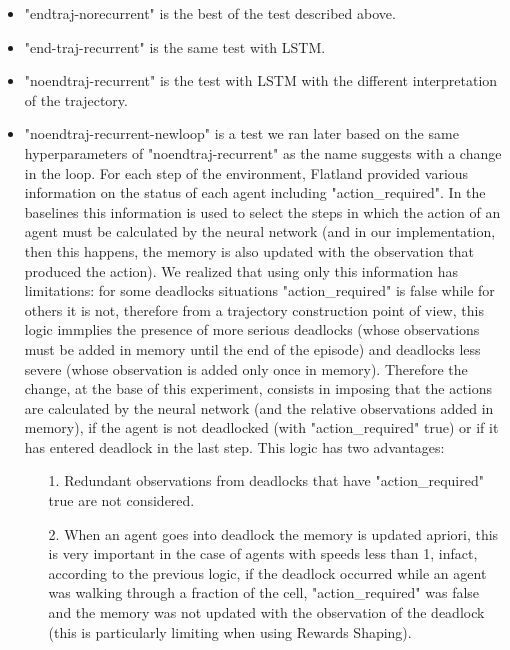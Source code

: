 \documentclass[11pt, a4paper, hidelinks]{report}
\begin{document}
\begin{itemize}
\item "endtraj-norecurrent" is the best of the test described above.
\item "end-traj-recurrent" is the same test with LSTM.
\item "noendtraj-recurrent" is the test with LSTM with the different interpretation of the trajectory. 
\item "noendtraj-recurrent-newloop" is a test we ran later based on the same hyperparameters of "noendtraj-recurrent" as the name suggests with a change in the loop. For each step of the environment, Flatland provided various information on the status of each agent including "action\_required". 
In the baselines this information is used to select the steps in which the action of an agent must be calculated by the neural network (and in our implementation, then this happens, the memory is also updated with the observation that produced the action). 
We realized that using only this information has limitations: for some deadlocks situations "action\_required" is false while for others it is not, therefore from a trajectory construction point of view, this logic immplies the presence of more serious deadlocks (whose observations must be added in memory until the end of the episode) and deadlocks less severe (whose observation is added only once in memory). 
Therefore the change, at the base of this experiment, consists in imposing that the actions are calculated by the neural network (and the relative observations added in memory), if the agent is not deadlocked (with "action\_required" true) or if it has entered deadlock in the last step. 
This logic has two advantages: 
\begin{enumerate}
\item [1.] Redundant observations from deadlocks that have "action\_required" true are not considered.
\item [2.] When an agent goes into deadlock the memory is updated apriori, this is very important in the case of agents with speeds less than 1, infact, according to the previous logic, if the deadlock occurred while an agent was walking through a fraction of the cell, "action\_required" was false and the memory was not updated with the observation of the deadlock (this is particularly limiting when using Rewards Shaping).
\end{enumerate}
\end{itemize}
\end{document}
